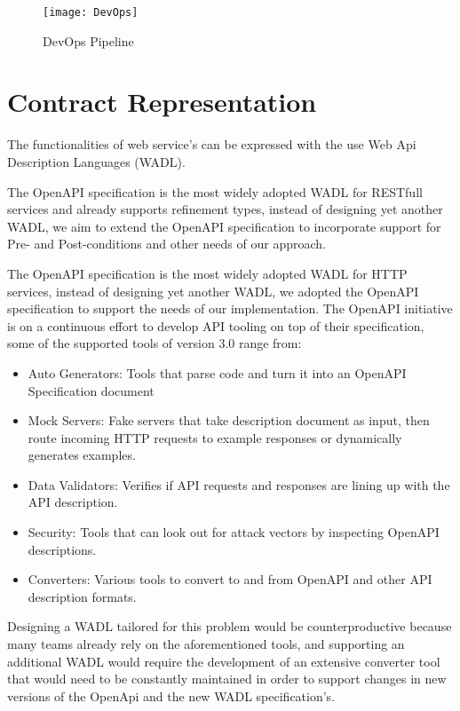 \begin{figure}[htbp]
    \centering
    \texttt{[image: DevOps]}
    \caption{DevOps Pipeline}
    \label{fig:pipeline}
\end{figure}

\newpage

\section{Contract Representation} %
\label{sec:contract_representation}

The functionalities of web service's can be expressed with the
use Web Api Description Languages (WADL).

The OpenAPI specification is the most widely adopted WADL for RESTfull services and already supports refinement types, instead of designing yet another WADL,
we aim to extend the OpenAPI specification to incorporate support for Pre- and Post-conditions and other needs of our approach.

The OpenAPI specification is the most
widely adopted WADL for HTTP services, instead of designing yet another WADL, we
adopted the OpenAPI specification to support the needs of our implementation.
The OpenAPI initiative is on a continuous effort to develop API tooling on top of their specification, some of the supported tools of version 3.0 range from:

\begin{itemize}
    \item Auto Generators: Tools that parse code and turn it into an OpenAPI Specification document
    \item Mock Servers: Fake servers that take description document as input, then route incoming HTTP requests to example responses or dynamically generates examples.
    \item Data Validators: Verifies if API requests and responses are lining up with the API description.
    \item Security: Tools that can look out for attack vectors by inspecting OpenAPI descriptions.
    \item Converters: Various tools to convert to and from OpenAPI and other API description formats.
\end{itemize}

Designing a WADL tailored for this problem would be counterproductive because many teams already rely on the aforementioned tools,
and supporting an additional WADL would require the development of an extensive converter tool
that would need to be constantly maintained in order to support changes in new versions of the OpenApi and the new WADL specification's.

